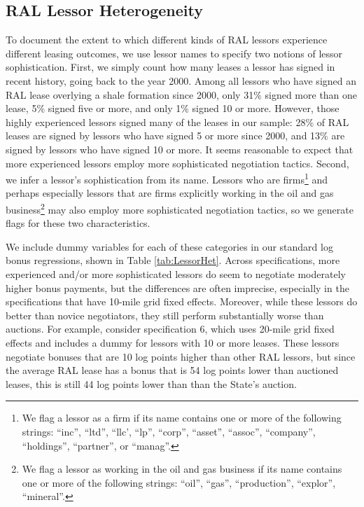 \documentclass[12pt]{article}
\begin{document}
\begin{appendices}
\subsection{RAL Lessor Heterogeneity}\label{app:lessor_hetero}
To document the extent to which different kinds of RAL lessors experience different leasing outcomes, we use lessor names to specify two notions of lessor sophistication.  First, we simply count how many leases a lessor has signed in recent history, going back to the year 2000.  Among all lessors who have signed an RAL lease overlying a shale formation since 2000, only 31\% signed more than one lease, 5\% signed five or more, and only 1\% signed 10 or more.  However, those highly experienced lessors signed many of the leases in our sample: 28\% of RAL leases are signed by lessors who have signed 5 or more since 2000, and 13\% are signed by lessors who have signed 10 or more.  It seems reasonable to expect that more experienced lessors employ more sophisticated negotiation tactics.  Second, we infer a lessor's sophistication from its name.  Lessors who are firms\footnote{We flag a lessor as a firm if its name contains one or more of the following strings: ``inc'', ``ltd'', ``llc', ``lp'', ``corp'', ``asset'', ``assoc'', ``company'', ``holdings'', ``partner'', or ``manag''.} and perhaps especially lessors that are firms explicitly working in the oil and gas business\footnote{We flag a lessor as working in the oil and gas business if its name contains one or more of the following strings: ``oil'', ``gas'', ``production'', ``explor'', ``mineral''.} may also employ more sophisticated negotiation tactics, so we generate flags for these two characteristics.  

We include dummy variables for each of these categories in our standard log bonus regressions, shown in Table \ref{tab:LessorHet}.  Across specifications, more experienced and/or more sophisticated lessors do seem to negotiate moderately higher bonus payments, but the differences are often imprecise, especially in the specifications that have 10-mile grid fixed effects. Moreover, while these lessors do better than novice negotiators, they still perform substantially worse than auctions. For example, consider specification 6, which uses 20-mile grid fixed effects and includes a dummy for lessors with 10 or more leases.  These lessors negotiate bonuses that are 10 log points higher than other RAL lessors, but since the average RAL lease has a bonus that is 54 log points lower than auctioned leases, this is still 44 log points lower than than the State's auction.


\end{appendices}
\end{document}
